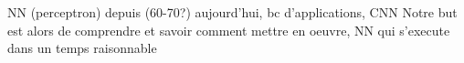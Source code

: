 \startsubject
[title=Introducti
on]
NN (perceptron) depuis (60-70?) aujourd'hui, bc d'applications, CNN
Notre but est alors de comprendre et savoir comment mettre en oeuvre, NN qui s'execute dans un temps raisonnable
\stopsubject